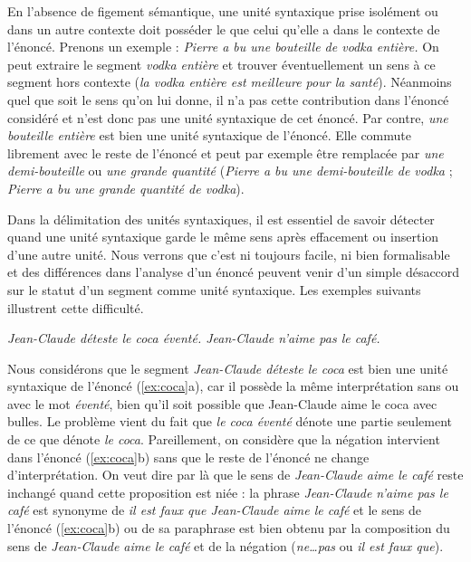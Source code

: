 En l’absence de figement sémantique, une unité syntaxique prise isolément ou dans un autre contexte doit posséder le  que celui qu’elle a dans le contexte de l’énoncé. Prenons un exemple : \textit{Pierre a bu une bouteille de vodka entière.} On peut extraire le segment \textit{vodka entière} et trouver éventuellement un sens à ce segment hors contexte (\textit{la vodka entière est meilleure pour la santé}). Néanmoins quel que soit le sens qu’on lui donne, il n’a pas cette contribution dans l’énoncé considéré et n’est donc pas une unité syntaxique de cet énoncé. Par contre, \textit{une bouteille entière} est bien une unité syntaxique de l’énoncé. Elle commute librement avec le reste de l’énoncé et peut par exemple être remplacée par \textit{une demi-bouteille} ou \textit{une grande quantité} (\textit{Pierre a bu une demi-bouteille de vodka} ; \textit{Pierre a bu une grande quantité de vodka}).

Dans la délimitation des unités syntaxiques, il est essentiel de savoir détecter quand une unité syntaxique garde le même sens après effacement ou insertion d’une autre unité. Nous verrons que c’est ni toujours facile, ni bien formalisable et des différences dans l’analyse d’un énoncé peuvent venir d’un simple désaccord sur le statut d’un segment comme unité syntaxique. Les exemples suivants illustrent cette difficulté.

\ea\label{ex:coca}
\ea\itshape     {Jean-Claude}  {déteste}  {le}  {coca}  {éventé.}
\ex\itshape     {Jean-Claude}  {n’aime}  {pas}  {le}  {café.}
\z
\z

Nous considérons que le segment \textit{Jean-Claude déteste le coca} est bien une unité syntaxique de l’énoncé (\ref{ex:coca}a), car il possède la même interprétation sans ou avec le mot \textit{éventé}, bien qu’il soit possible que Jean-Claude aime le coca avec bulles. Le problème vient du fait que \textit{le coca éventé} dénote une partie seulement de ce que dénote \textit{le coca}. Pareillement, on considère que la négation intervient dans l’énoncé (\ref{ex:coca}b) sans que le reste de l’énoncé ne change d’interprétation. On veut dire par là que le sens de \textit{Jean-Claude aime le café} reste inchangé quand cette proposition est niée : la phrase \textit{Jean-Claude n’aime pas le café} est synonyme de \textit{il est faux que Jean-Claude aime le café} et le sens de l’énoncé (\ref{ex:coca}b) ou de sa paraphrase est bien obtenu par la composition du sens de \textit{Jean-Claude aime le café} et de la négation (\textit{ne…pas} ou \textit{il est faux que}).

